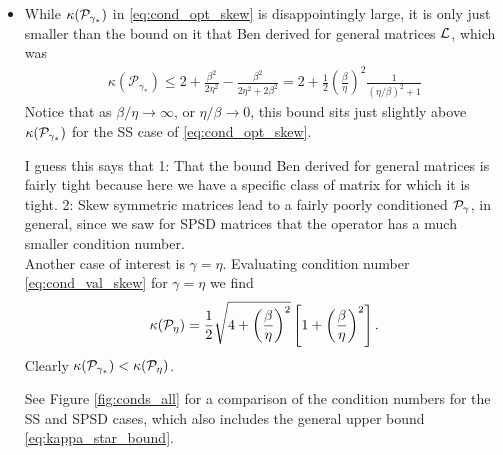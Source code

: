 \documentclass[a4paper,10pt]{article}
\begin{document}
{\begin{itemize}
\begin{proof}
Finally, by virtue of its relationship with $\kappa^2$, $\kappa$ is strictly decreasing for $\sqrt{\max(\eta^2 - 2 \beta^2, 0)} < \gamma < \eta + \beta^2/\eta$, and strictly increasing for $\gamma > \eta + \beta^2/\eta$. Therefore $\kappa$ is minimized at the interface, $\gamma = \gamma_* = \eta + \beta^2/\eta$, as in \eqref{eq:gamma_opt_skew}. Evaluating \eqref{eq:cond_2} at $\gamma_*$ gives result \eqref{eq:cond_opt_skew}.\\
\end{proof}

\item

While $\kappa({\cal P}_{\gamma_*})$ in \eqref{eq:cond_opt_skew} is disappointingly large, it is only just smaller than the bound on it that Ben derived for general matrices ${\cal L}$, which was 
\begin{align} 
\label{eq:kappa_star_bound}
\kappa(\mathcal{P}_{\gamma_*}) \leq 2+\frac{\beta^2}{2\eta^2} - \frac{\beta^2}{2\eta^2+2\beta^2}
= 2 + \frac{1}{2} \left( \frac{\beta}{\eta} \right)^2 \frac{1}{(\eta/\beta)^2 + 1}
\end{align}
Notice that as $\beta/\eta \to \infty$, or $\eta/\beta \to 0$, this bound sits just slightly above $\kappa({\cal P}_{\gamma_*})$ for the SS case of \eqref{eq:cond_opt_skew}.

I guess this says that 1: That the bound Ben derived for general matrices is fairly tight because here we have a specific class of matrix for which it is tight. 2: Skew symmetric matrices lead to a fairly poorly conditioned ${\cal P}_{\gamma}$, in general, since we saw for SPSD matrices that the operator has a much smaller condition number.\\

Another case of interest is $\gamma = \eta$. Evaluating condition number \eqref{eq:cond_val_skew} for $\gamma = \eta$ we find
\begin{align}
\label{eq:kappa_eta_skew}
\kappa({\cal P}_{\eta}) = \frac{1}{2} \sqrt{4 + \left( \frac{\beta}{\eta} \right)^2} \left[ 1 + \left( \frac{\beta}{\eta} \right)^2 \right].
\end{align}
Clearly $\kappa({\cal P}_{\gamma_*}) < \kappa({\cal P}_{\eta})$. 

See Figure \ref{fig:conds_all} for a comparison of the condition numbers for the SS and SPSD cases, which also includes the general upper bound \eqref{eq:kappa_star_bound}.

\end{itemize}

}
\end{document}

